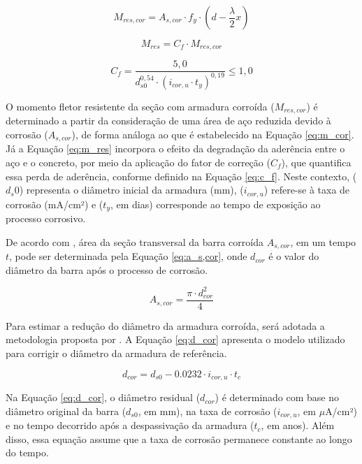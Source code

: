 \begin{equation}\label{eq:m_cor}
M_{res,cor} = A_{s,cor} \cdot f_y \cdot \left( d - \frac{\lambda}{2} x \right)
\end{equation}

\begin{equation}\label{eq:m_res}
M_{res} = C_f \cdot M_{res,cor}
\end{equation}

\begin{equation}\label{eq:c_f}
C_f = \frac{5,0}{d_{s0}^{0,54} \cdot (i_{cor,u} \cdot t_y)^{0,19}} \leq 1,0
\end{equation}

O momento fletor resistente da seção com armadura corroída  ($M_{res,cor}$) é determinado a partir da consideração de uma área de aço reduzida devido à corrosão ($A_{s,cor}$), de forma análoga ao que é estabelecido na Equação \eqref{eq:m_cor}. Já a Equação \eqref{eq:m_res} incorpora o efeito da degradação da aderência entre o aço e o concreto, por meio da aplicação do fator de correção ($C_f$), que quantifica essa perda de aderência, conforme definido na Equação \eqref{eq:c_f}. Neste contexto, ($d_s0$) representa o diâmetro inicial da armadura (mm), ($i_{cor,u}$) refere-se à taxa de corrosão (mA/cm²) e ($t_y$, em dias) corresponde ao tempo de exposição ao processo corrosivo.

De acordo com \textcite{Azad2010}, área da seção transversal da barra corroída $A_{s,cor}$, em um tempo $t$, pode ser determinada pela Equação \eqref{eq:a_s,cor}, onde $d_{cor}$ é o valor do diâmetro da barra após o processo de corrosão.

\begin{equation}\label{eq:a_s,cor}
A_{s,cor} = \frac{\pi \cdot d_{cor}^2}{4}
\end{equation}

Para estimar a redução do diâmetro da armadura corroída, será adotada a metodologia proposta por \textcite{pellizzer_time-dependent_2020, ValMelchers1997, ThoftChristensen1997}. A Equação \eqref{eq:d_cor} apresenta o modelo utilizado para corrigir o diâmetro da armadura de referência.

\begin{equation}\label{eq:d_cor}
d_{cor} = d_{s0} - 0.0232 \cdot i_{cor,u} \cdot t_c
\end{equation}

Na Equação \eqref{eq:d_cor}, o diâmetro residual ($d_{cor}$) é determinado com base no diâmetro original da barra ($d_{s0}$, em mm), na taxa de corrosão ($i_{cor,u}$, em $\mu$A/cm²) e no tempo decorrido após a despassivação da armadura ($t_c$, em anos). Além disso, essa equação assume que a taxa de corrosão permanece constante ao longo do tempo.

